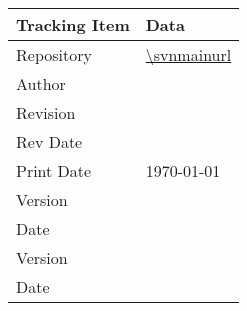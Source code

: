 \begin{table}[htbp]
	\centering
		\begin{tabular}{|p{2.0in}|p{4.4in}|}
		\hline
			{\bfseries Tracking Item}  &  {\bfseries Data} \\
		\hline		
		\hline
			Repository         & \url{\svnmainurl}  \\
		\hline
			Author         & \svnauthor  \\			
		\hline
			Revision       & \svnrev     \\	
		\hline
			Rev Date       & \svndate    \\	
		\hline	
			Print Date     & \today{} \currenttime    \\	
		\hline
			\DocumentClsName\break Version     & \DocumentClsVersion    \\	
		\hline	
			\DocumentClsName\break Date        & \DocumentClsDate   \\	
		\hline
			\DocumentTexName\break Version     & \DocumentTexVersion    \\	
		\hline	
			\DocumentTexName\break Date        & \DocumentTexDate   \\	
		\hline						
    \end{tabular}
\end{table}